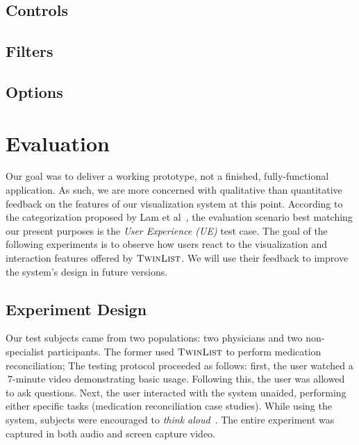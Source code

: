 \documentclass{chi2009}
\newcommand{\TwinList}{\textsc{TwinList}}
\begin{document}
\subsection{Controls}

\subsection{Filters}

\subsection{Options}

\section{Evaluation}
Our goal was to deliver a working prototype, not a finished, fully-functional application. As such, we are more concerned with qualitative than quantitative feedback on the features of our visualization system at this point. According to the categorization proposed by Lam et al~\cite{lam-bertini-isenberg-plaisant-carpendale-2011}, the evaluation scenario best matching our present purposes is the \textit{User Experience (UE)} test case. The goal of the following experiments is to observe how users react to the visualization and interaction features offered by $\TwinList$. We will use their feedback to improve the system's design in future versions.

\subsection{Experiment Design}
Our test subjects came from two populations: two physicians and two non-specialist participants. The former used $\TwinList$ to perform medication reconciliation; The testing protocol proceeded as follows: first, the user watched a $~7$-minute video demonstrating basic usage. Following this, the user was allowed to ask questions. Next, the user interacted with the system unaided, performing either specific tasks (medication reconciliation case studies). While using the system, subjects were encouraged to \textit{think aloud}~\cite{lewis-1982}. The entire experiment was captured in both audio and screen capture video. 
\end{document}

